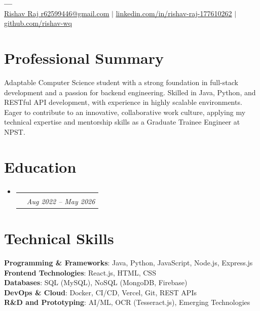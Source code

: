 \documentclass[letterpaper,10.5pt]{article}
\makeatletter
\newcommand{\resumeSubheading}[4]{
  \vspace{-2pt}\item
    \begin{tabular*}{0.97\textwidth}[t]{l@{\extracolsep{\fill}}r}
      \textbf{#1} & #2 \\
      \textit{\small#3} & \textit{\small #4} \\
    \end{tabular*}\vspace{-8pt}
}
\newcommand{\resumeSubHeadingListStart}{\begin{itemize}[leftmargin=0.15in, label={}]}
\newcommand{\resumeSubHeadingListEnd}{\end{itemize}}
\makeatother
\begin{document}
\begin{center}
    \textbf{\Huge \scshape ---} \\ \vspace{1pt}
    \href{mailto:Rishav Raj r62599446@gmail.com}{\underline{Rishav Raj r62599446@gmail.com}} $|$ \href{https://linkedin.com/in/rishav-raj-177610262}{\underline{linkedin.com/in/rishav-raj-177610262}} $|$ \href{https://github.com/rishav-wq}{\underline{github.com/rishav-wq}}
\end{center}

\section{Professional Summary}
Adaptable Computer Science student with a strong foundation in full-stack development and a passion for backend engineering. Skilled in Java, Python, and RESTful API development, with experience in highly scalable environments. Eager to contribute to an innovative, collaborative work culture, applying my technical expertise and mentorship skills as a Graduate Trainee Engineer at NPST.

\section{Education}
  \resumeSubHeadingListStart
    \resumeSubheading
      {}{}
      {}{Aug 2022 – May 2026}
  \resumeSubHeadingListEnd
\vspace{2pt}

\section{Technical Skills}
 \begin{itemize}[leftmargin=0.15in, label={}]
    \small{\item{
     \textbf{Programming \& Frameworks}{: Java, Python, JavaScript, Node.js, Express.js} \\
     \textbf{Frontend Technologies}{: React.js, HTML, CSS} \\
     \textbf{Databases}{: SQL (MySQL), NoSQL (MongoDB, Firebase)} \\
     \textbf{DevOps \& Cloud}{: Docker, CI/CD, Vercel, Git, REST APIs} \\
     \textbf{R\&D and Prototyping}{: AI/ML, OCR (Tesseract.js), Emerging Technologies} \\
    }}
 \end{itemize}
\end{document}
